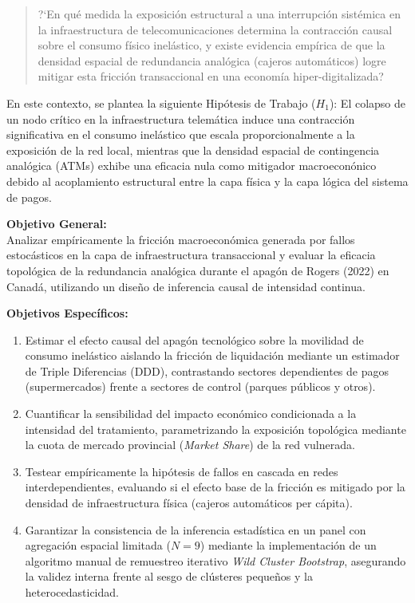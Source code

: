 \begin{quote}
?`En qu\'e medida la exposici\'on estructural a una interrupci\'on sist\'emica en la infraestructura de telecomunicaciones determina la contracci\'on causal sobre el consumo f\'isico inel\'astico, y existe evidencia emp\'irica de que la densidad espacial de redundancia anal\'ogica (cajeros autom\'aticos) logre mitigar esta fricci\'on transaccional en una econom\'ia hiper-digitalizada?
\end{quote}

En este contexto, se plantea la siguiente Hip\'otesis de Trabajo ($H_1$): El colapso de un nodo cr\'itico en la infraestructura telem\'atica induce una contracci\'on significativa en el consumo inel\'astico que escala proporcionalmente a la exposici\'on de la red local, mientras que la densidad espacial de contingencia anal\'ogica (ATMs) exhibe una eficacia nula como mitigador macroecon\'onico debido al acoplamiento estructural entre la capa f\'isica y la capa l\'ogica del sistema de pagos.

\textbf{Objetivo General:} \\
Analizar emp\'iricamente la fricci\'on macroecon\'omica generada por fallos estoc\'asticos en la capa de infraestructura transaccional y evaluar la eficacia topol\'ogica de la redundancia anal\'ogica durante el apag\'on de Rogers (2022) en Canad\'a, utilizando un dise\~no de inferencia causal de intensidad continua.

\vspace{0.3cm}
\textbf{Objetivos Espec\'ificos:}
\begin{enumerate}
    \item Estimar el efecto causal del apag\'on tecnol\'ogico sobre la movilidad de consumo inel\'astico aislando la fricci\'on de liquidaci\'on mediante un estimador de Triple Diferencias (DDD), contrastando sectores dependientes de pagos (supermercados) frente a sectores de control (parques p\'ublicos y otros).
    \item Cuantificar la sensibilidad del impacto econ\'omico condicionada a la intensidad del tratamiento, parametrizando la exposici\'on topol\'ogica mediante la cuota de mercado provincial (\textit{Market Share}) de la red vulnerada.
    \item Testear emp\'iricamente la hip\'otesis de fallos en cascada en redes interdependientes, evaluando si el efecto base de la fricci\'on es mitigado por la densidad de infraestructura f\'isica (cajeros autom\'aticos per c\'apita).
    \item Garantizar la consistencia de la inferencia estad\'istica en un panel con agregaci\'on espacial limitada ($N=9$) mediante la implementaci\'on de un algoritmo manual de remuestreo iterativo \textit{Wild Cluster Bootstrap}, asegurando la validez interna frente al sesgo de cl\'usteres peque\~nos y la heterocedasticidad.
\end{enumerate}

